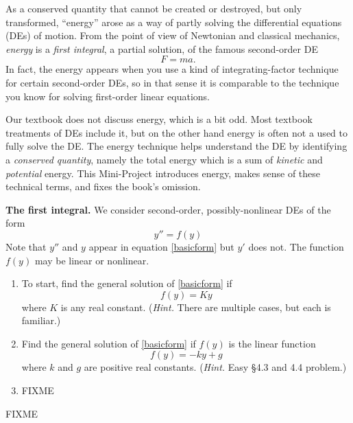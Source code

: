 \documentclass[12pt]{article}
\begin{document}
\normalsize
As a conserved quantity that cannot be created or destroyed, but only transformed, ``energy'' arose as a way of partly solving the differential equations (DEs) of motion.  From the point of view of Newtonian and classical mechanics, \emph{energy} is a \emph{first integral}, a partial solution, of the famous second-order DE
\begin{equation}
    F=ma.  \label{Newton2nd}
\end{equation}
In fact, the energy appears when you use a kind of integrating-factor technique for certain second-order DEs, so in that sense it is comparable to the technique you know for solving first-order linear equations.

Our textbook does not discuss energy, which is a bit odd.  Most textbook treatments of DEs include it, but on the other hand energy is often not a used to fully solve the DE.  The energy technique helps understand the DE by identifying a \emph{conserved quantity}, namely the total energy which is a sum of \emph{kinetic} and \emph{potential} energy.  This Mini-Project introduces energy, makes sense of these technical terms, and fixes the book's omission.

\medskip
\textbf{The first integral.}  We consider second-order, possibly-nonlinear DEs of the form
\begin{equation}
y'' = f(y) \label{basicform}
\end{equation}
Note that $y''$ and $y$ appear in equation \eqref{basicform} but $y'$ does not.  The function $f(y)$ may be linear or nonlinear.

\renewcommand{\labelenumi}{\textbf{(\alph{enumi})}}
\begin{enumerate}
\item To start, find the general solution of \eqref{basicform} if
    $$f(y) = Ky$$
where $K$ is any real constant.  (\emph{Hint.}  There are multiple cases, but each is familiar.)
\item Find the general solution of \eqref{basicform} if $f(y)$ is the linear function
    $$f(y) = -ky + g$$
where $k$ and $g$ are positive real constants.  (\emph{Hint.}  Easy \S 4.3 and 4.4 problem.)
\item FIXME
\end{enumerate}

FIXME
\end{document}
